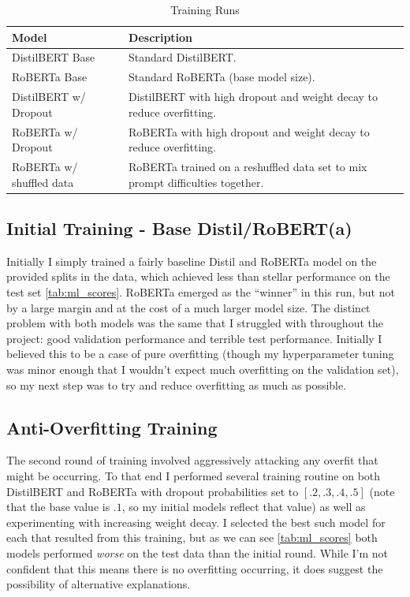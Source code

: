 \documentclass[11pt,a4paper]{article}
\begin{document}
\begin{table}[t]
\centering
\caption{Training Runs}
\label{tab:ml_models}
\begin{tabular}{|l|p{6cm}|}
\hline
\textbf{Model} & \textbf{Description} \\ \hline
DistilBERT Base & Standard DistilBERT. \\ \hline
RoBERTa Base &  Standard RoBERTa (base model size).\\ \hline
DistilBERT w/ Dropout & DistilBERT with high dropout and weight decay to reduce overfitting. \\ \hline
RoBERTa w/ Dropout & RoBERTa with high dropout and weight decay to reduce overfitting. \\ \hline
RoBERTa w/ shuffled data & RoBERTa trained on a reshuffled data set to mix prompt difficulties together. \\ \hline
\end{tabular}
\end{table}

\subsection{Initial Training - Base Distil/RoBERT(a)}

Initially I simply trained a fairly baseline Distil and RoBERTa model on the provided splits in the data, which achieved less than stellar performance on the test set \ref{tab:ml_scores}. RoBERTa emerged as the ``winner'' in this run, but not by a large margin and at the cost of a much larger model size. The distinct problem with both models was the same that I struggled with throughout the project: good validation performance and terrible test performance. Initially I believed this to be a case of pure overfitting (though my hyperparameter tuning was minor enough that I wouldn't expect much overfitting on the validation set), so my next step was to try and reduce overfitting as much as possible.

\subsection{Anti-Overfitting Training}

The second round of training involved aggressively attacking any overfit that might be occurring. To that end I performed several training routine on both DistilBERT and RoBERTa with dropout probabilities set to $[.2, .3, .4, .5]$ (note that the base value is $.1$, so my initial models reflect that value) as well as experimenting with increasing weight decay. I selected the best such model for each that resulted from this training, but as we can see \ref{tab:ml_scores} both models performed \textit{worse} on the test data than the initial round. While I'm not confident that this means there is no overfitting occurring, it does suggest the possibility of alternative explanations. 
\end{document}
